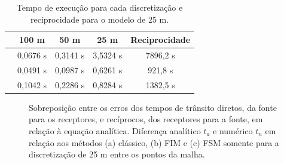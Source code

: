 \begin{table}[H]
	\caption{Tempo de execução para cada discretização e reciprocidade para o modelo de 25 m.}
	\begin{tabular}{r|cccc}
		& 100 m    & 50 m     & 25 m     & Reciprocidade \\ \hline
		\citeonline{podvin1991finite}   & 0,0676 s & 0,3141 s & 3,5324 s & 7896,2 s        \\ \hline
		\citeonline{jeong2008fast} & 0,0491 s & 0,0987 s & 0,6261 s & 921,8 s              \\ \hline
		\citeonline{noble2014accurate} & 0,1042 s & 0,2286 s & 0,8284 s & 1382,5 s          \\
	\end{tabular}
	\label{table_refModel}
\end{table}

\begin{figure}[H]
	\centering
	\newline
	\newline
	
	\caption{Sobreposição entre os erros dos tempos de trânsito diretos, da fonte para os receptores, e recíprocos, dos receptores para a fonte, em relação à equação analítica. Diferença analítico $t_a$ e numérico $t_n$ em relação aos métodos (a) clássico, (b) FIM e (c) FSM somente para a discretização de 25 m entre os pontos da malha.}  
	\label{fig:reciprocity_refraction_study}
\end{figure}


